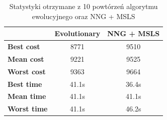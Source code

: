 \documentclass[a4paper 10pt]{article}
\begin{document}
\begin{table}[H]
\centering
\caption{Statystyki otrzymane z 10 powtórzeń algorytmu ewolucyjnego oraz NNG + MSLS}
\label{my-label}
\begin{tabular}{|l|c|c|}
\hline
                    & \multicolumn{1}{l|}{\textbf{Evolutionary}} & \multicolumn{1}{l|}{\textbf{NNG + MSLS}} \\ \hline
\textbf{Best cost}  & 8771                                       & 9510                                     \\ \hline
\textbf{Mean cost}  & 9221                                       & 9525                                     \\ \hline
\textbf{Worst cost} & 9363                                       & 9664                                     \\ \hline
\textbf{Best time}  & 41.1s                                      & 36.4s                                    \\ \hline
\textbf{Mean  time} & 41.1s                                      & 41.1s                                    \\ \hline
\textbf{Worst time} & 41.1s                                      & 46.2s                                    \\ \hline
\end{tabular}
\end{table}
\end{document}
